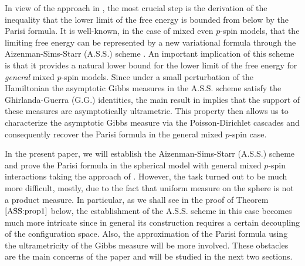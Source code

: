 \documentclass[12pt]{article}
\newenvironment{Proof of lemma}{\noindent{\bf Proof of Lemma}}{\hfill$\Box$\newline}
\newenvironment{Proof of theorem}{\noindent{\bf Proof of Theorem}}{\hfill{\footnotesize${\square}$}\newline}
\newenvironment{Proof of theorems}{\noindent{\bf Proof of Theorems}}{\hfill$\Box$\newline}
\newenvironment{Proof of proposition}{\noindent{\bf Proof of Proposition}}{\hfill$\Box$\newline}
\newenvironment{Proof of propositions}{\noindent{\bf Proof of Propositions}}{\hfill$\Box$\newline}
\newenvironment{Proof of exercise}{\noindent{\it Proof of Exercise:}}{\hfill$\Box$}
\numberwithin{equation}{section}
\begin{document}
In view of the approach in \cite{Pan11:1}, the most crucial step is the derivation of the inequality that the lower limit of the free energy is bounded from below by the Parisi formula. It is well-known, in the case of mixed even $p$-spin models, that the limiting free energy can be represented by a new variational formula through the Aizenman-Sims-Starr (A.S.S.) scheme \cite{ASS03}. An important implication of this scheme is that it provides a natural lower bound for the lower limit of the free energy for {\it general} mixed $p$-spin models. Since under a small perturbation of the Hamiltonian the asymptotic Gibbs measures in the A.S.S. scheme satisfy the Ghirlanda-Guerra (G.G.) identities, the main result in \cite{Pan11:4} implies that the support of these measures are asymptotically ultrametric. This property then allows us to characterize the asymptotic Gibbs measure via the Poisson-Dirichlet cascades and consequently recover the Parisi formula in the general mixed $p$-spin case.

In the present paper, we will establish the Aizenman-Sims-Starr (A.S.S.) scheme and prove the Parisi formula in the spherical model with general mixed $p$-spin interactions taking the approach of \cite{Pan11:1}.  However, the task turned out to be much more difficult, mostly, due to the fact that uniform measure on the sphere is not a product measure. In particular, as we shall see in the proof of Theorem $\ref{ASS:prop1}$ below, the establishment of the A.S.S. scheme in this case becomes much more intricate since in general its construction requires a certain decoupling of the configuration space. Also, the approximation of the Parisi formula using the ultrametricity of the Gibbs measure will be more involved. These obstacles are the main concerns of the paper and will be studied in the next two sections.
\end{document}
